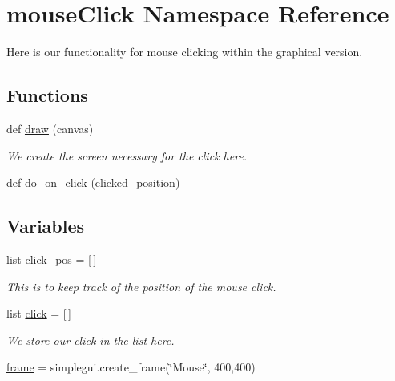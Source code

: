 \hypertarget{namespacemouseClick}{}\section{mouse\+Click Namespace Reference}
\label{namespacemouseClick}


Here is our functionality for mouse clicking within the graphical version.  


\subsection*{Functions}
\begin{DoxyCompactItemize}
\item 
def \hyperlink{namespacemouseClick_af3f4eb0bf9535bf4d741664f3093bb34}{draw} (canvas)
\begin{DoxyCompactList}\small\item\em We create the screen necessary for the click here. \end{DoxyCompactList}\item 
def \hyperlink{namespacemouseClick_a758ffac82f61834485114e0e2437a580}{do\+\_\+on\+\_\+click} (clicked\+\_\+position)
\end{DoxyCompactItemize}
\subsection*{Variables}
\begin{DoxyCompactItemize}
\item 
list \hyperlink{namespacemouseClick_a56650027db7949d822274f7fa9f7db68}{click\+\_\+pos} = \mbox{[}$\,$\mbox{]}
\begin{DoxyCompactList}\small\item\em This is to keep track of the position of the mouse click. \end{DoxyCompactList}\item 
list \hyperlink{namespacemouseClick_a938e2b4fc69bc0d8879bc8e431f5c4db}{click} = \mbox{[}$\,$\mbox{]}
\begin{DoxyCompactList}\small\item\em We store our \textquotesingle{}click\textquotesingle{} in the list here. \end{DoxyCompactList}\item 
\hyperlink{namespacemouseClick_a24bd188bbe2a1501d1d8553a8a4457d8}{frame} = simplegui.\+create\+\_\+frame(\char`\"{}Mouse\char`\"{}, 400,400)
\end{DoxyCompactItemize}


